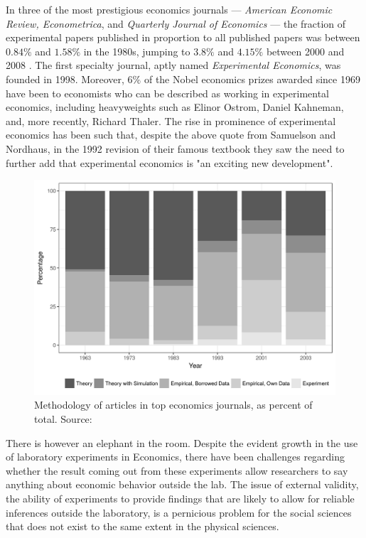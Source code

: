 \documentclass[12pt]{article}
\begin{document}
In three of the most prestigious economics journals --- \textit{American Economic Review, Econometrica}, and \textit{Quarterly Journal of Economics} --- the fraction of experimental papers published in proportion to all published papers was between $0.84\%$ and $1.58\%$ in the 1980s, jumping to $3.8\%$ and $4.15\%$ between 2000 and 2008 \citep{Falk2009}. The first specialty journal, aptly named \textit{Experimental Economics}, was founded in 1998. Moreover, $6\%$ of the Nobel economics prizes awarded since 1969 have been to economists who can be described as working in experimental economics, including heavyweights such as Elinor Ostrom, Daniel Kahneman, and, more recently, Richard Thaler. The rise in prominence of experimental economics has been such that, despite the above quote from Samuelson and Nordhaus, in the 1992 revision of their famous textbook they saw the need to further add that experimental economics is "an exciting new development"\citep[p.~5]{Samuelson1992}.

\begin{figure}[H]
	\centering
	\includegraphics[width=1.\textwidth]{proportion.png}
	\caption{Methodology of articles in top economics journals, as percent of total. Source: \citep{mearsheimer2013leaving}}
	\label{fig:proportion}
\end{figure}


There is however an elephant in the room. Despite the evident growth in the use of laboratory experiments in Economics, there have been challenges regarding whether the result coming out from these experiments allow researchers to say anything about economic behavior outside the lab. The issue of external validity, the ability of experiments to provide findings that are likely to allow for reliable inferences outside the laboratory, is a pernicious problem for the social sciences that does not exist to the same extent in the physical sciences.
\end{document}
